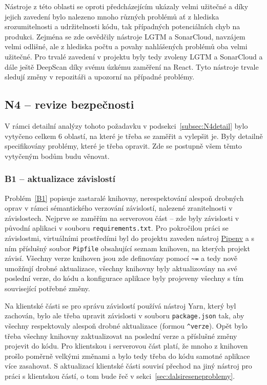 Nástroje z této oblasti se oproti předcházejícím ukázaly velmi užitečné a díky jejich zavedení bylo nalezeno mnoho různých problémů ať z hlediska srozumitelnosti a udržitelnosti kódu, tak případných potenciálních chyb na produkci. Zejména se zde osvědčily nástroje LGTM a SonarCloud, navzájem velmi odlišné, ale z hlediska počtu a povahy nahlášených problémů oba velmi užitečné. Pro trvalé zavedení v projektu byly tedy zvoleny LGTM a SonarCloud a dále ještě DeepScan díky svému úzkému zaměření na React. Tyto nástroje trvale sledují změny v repozitáři a upozorní na případné problémy.

\subsection{N4 -- revize bezpečnosti}\label{subsec:N4implementace}

V rámci detailní analýzy tohoto požadavku v podsekci~\ref{subsec:N4detail} bylo vytyčeno celkem 6 oblastí, na které je třeba se zaměřit a vylepšit je. Byly detailně specifikovány problémy, které je třeba opravit. Zde se postupně všem těmto vytyčeným bodům budu věnovat.

\subsubsection{B1 -- aktualizace závislostí}

Problém~\ref{B1} popisuje zastaralé knihovny, nerespektování alespoň drobných oprav v rámci sémantického verzování závislostí, nalezené zranitelnosti v závislostech. Nejprve se zaměřím na serverovou část -- zde byly závislosti v původní aplikaci v souboru \verb|requirements.txt|. Pro pokročilou práci se závislostmi, virtuálními prostředími \cite{pipenv-realpython} byl do projektu zaveden nástroj \href{https://pipenv.pypa.io/en/latest/}{Pipenv} a s ním příslušný soubor \verb|Pipfile| obsahující seznam knihoven, na kterých projekt závisí. Všechny verze knihoven jsou zde definovány pomocí \verb|~=| a tedy nově umožňují drobné aktualizace, všechny knihovny byly aktualizovány na své poslední verze, do kódu a konfigurace aplikace byly projeveny všechny s tím související potřebné změny.

Na klientské části se pro správu závislostí používá nástroj Yarn, který byl zachován, bylo ale třeba upravit závislosti v souboru \verb|package.json| tak, aby všechny respektovaly alespoň drobné aktualizace (formou \verb|^verze|). Opět bylo třeba všechny knihovny zaktualizovat na poslední verze a příslušné změny projevit do kódu. Pro klientskou i serverovou část platí, že mnoho z knihoven prošlo poměrně velkými změnami a bylo tedy třeba do kódu samotné aplikace více zasahovat. S aktualizací klientské části souvisí přechod na jiný nástroj pro práci s klientskou částí, o tom bude řeč v sekci~\ref{sec:dalsireseneproblemy}.

